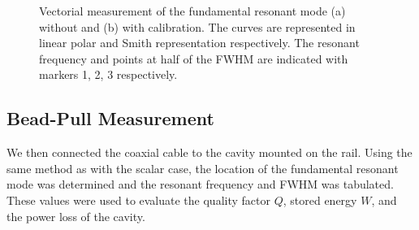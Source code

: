 \documentclass[a4paper]{report}
\numberwithin{equation}{section}
\begin{document}
\begin{figure}[htb!]
	\centering
	\quad

	\caption{Vectorial measurement of the fundamental resonant mode (a) without
	and (b) with calibration. The curves are represented in linear polar and
	Smith representation respectively. The resonant frequency and points at
	half of the FWHM are indicated with markers 1, 2, 3 respectively.
	}
	\label{fig:vectorial_raw}
\end{figure}

\subsection{Bead-Pull Measurement}
 

We then connected the coaxial cable to the cavity mounted on the rail. Using the
same method as with the scalar case, the location of the fundamental resonant
mode was determined and the resonant frequency and FWHM was tabulated. These
values were used to evaluate the quality factor $Q$, stored energy $W$, and the
power loss of the cavity. \par 
\end{document}
